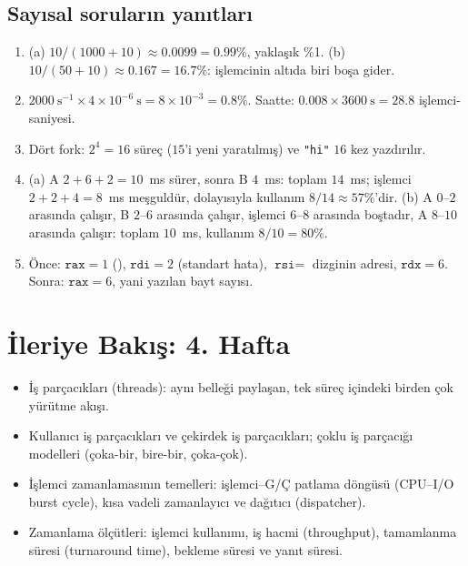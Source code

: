 \subsection*{Sayısal soruların yanıtları}
\begin{enumerate}[leftmargin=1.6em,start=8]
  \item (a) $10/(1000 + 10) \approx 0.0099 = 0.99\%$, yaklaşık \%1. (b) $10/(50 + 10) \approx 0.167 = 16.7\%$: işlemcinin altıda biri boşa gider.
  \item $2000\ \text{s}^{-1} \times 4\times10^{-6}\ \text{s} = 8\times10^{-3} = 0.8\%$. Saatte: $0.008 \times 3600\ \text{s} = 28.8$ işlemci-saniyesi.
  \item Dört fork: $2^{4} = 16$ süreç ($15$'i yeni yaratılmış) ve \texttt{"hi"} $16$ kez yazdırılır.
  \item (a) A $2 + 6 + 2 = 10$~ms sürer, sonra B $4$~ms: toplam $14$~ms; işlemci $2 + 2 + 4 = 8$~ms meşguldür, dolayısıyla kullanım $8/14 \approx 57\%$'dir. (b) A $0$--$2$ arasında çalışır, B $2$--$6$ arasında çalışır, işlemci $6$--$8$ arasında boştadır, A $8$--$10$ arasında çalışır: toplam $10$~ms, kullanım $8/10 = 80\%$.
  \item Önce: $\texttt{rax} = 1$ (), $\texttt{rdi} = 2$ (standart hata), $\texttt{rsi} =$ dizginin adresi, $\texttt{rdx} = 6$. Sonra: $\texttt{rax} = 6$, yani yazılan bayt sayısı.
\end{enumerate}

\section{İleriye Bakış: 4. Hafta}

\begin{itemize}
  \item İş parçacıkları (threads): aynı belleği paylaşan, tek süreç içindeki birden çok yürütme akışı.
  \item Kullanıcı iş parçacıkları ve çekirdek iş parçacıkları; çoklu iş parçacığı modelleri (çoka-bir, bire-bir, çoka-çok).
  \item İşlemci zamanlamasının temelleri: işlemci--G/Ç patlama döngüsü (CPU--I/O burst cycle), kısa vadeli zamanlayıcı ve dağıtıcı (dispatcher).
  \item Zamanlama ölçütleri: işlemci kullanımı, iş hacmi (throughput), tamamlanma süresi (turnaround time), bekleme süresi ve yanıt süresi.
\end{itemize}

